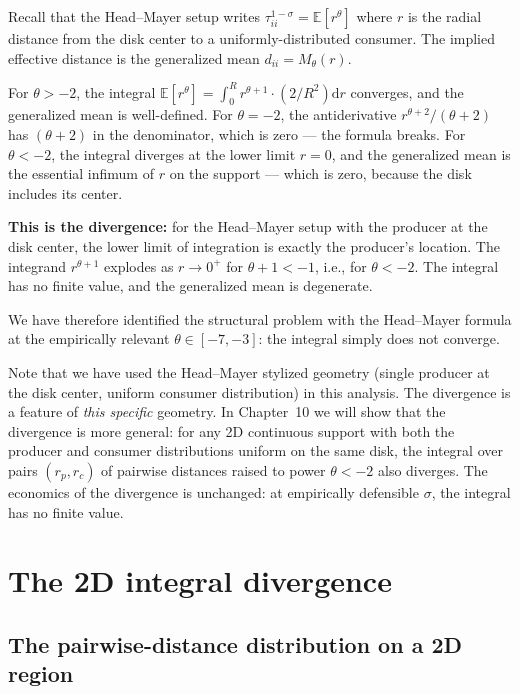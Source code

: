 \documentclass[11pt,letterpaper,oneside]{book}
\theoremstyle{definition}
\theoremstyle{remark}
\newcommand{\E}{\mathbb{E}}
\newcommand{\diff}{\mathrm{d}}
\begin{document}
Recall that the Head--Mayer setup writes $\tau_{ii}^{1-\sigma} = \E[r^\theta]$ where $r$ is the radial distance from the disk center to a uniformly-distributed consumer. The implied effective distance is the generalized mean $d_{ii} = M_\theta(r)$.

For $\theta > -2$, the integral $\E[r^\theta] = \int_0^R r^{\theta+1} \cdot (2/R^2) \diff r$ converges, and the generalized mean is well-defined. For $\theta = -2$, the antiderivative $r^{\theta+2}/(\theta+2)$ has $(\theta+2)$ in the denominator, which is zero --- the formula breaks. For $\theta < -2$, the integral diverges at the lower limit $r = 0$, and the generalized mean is the essential infimum of $r$ on the support --- which is zero, because the disk includes its center.

\textbf{This is the divergence:} for the Head--Mayer setup with the producer at the disk center, the lower limit of integration is exactly the producer's location. The integrand $r^{\theta+1}$ explodes as $r \to 0^+$ for $\theta + 1 < -1$, i.e., for $\theta < -2$. The integral has no finite value, and the generalized mean is degenerate.

We have therefore identified the structural problem with the Head--Mayer formula at the empirically relevant $\theta \in [-7, -3]$: the integral simply does not converge.

\begin{tcolorbox}[warning]
Note that we have used the Head--Mayer stylized geometry (single producer at the disk center, uniform consumer distribution) in this analysis. The divergence is a feature of \emph{this specific} geometry. In Chapter~10 we will show that the divergence is more general: for any 2D continuous support with both the producer and consumer distributions uniform on the same disk, the integral over pairs $(r_p, r_c)$ of pairwise distances raised to power $\theta < -2$ also diverges. The economics of the divergence is unchanged: at empirically defensible $\sigma$, the integral has no finite value.
\end{tcolorbox}

\chapter{The 2D integral divergence}

\section{The pairwise-distance distribution on a 2D region}
\end{document}
